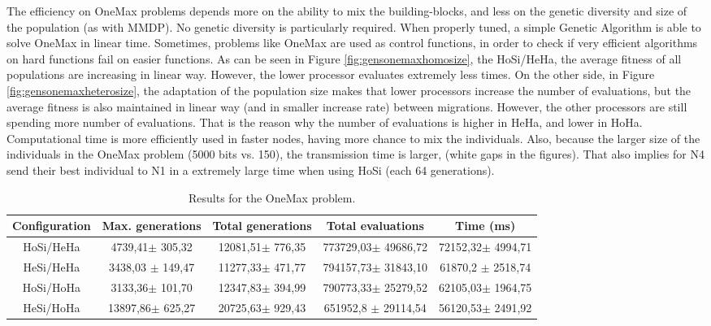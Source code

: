 \documentclass{sig-alternate}
\begin{document}
The efficiency on OneMax problems depends more on the ability to mix the building-blocks, and less on the genetic diversity and size of the population (as with MMDP). No genetic diversity is particularly required. When properly tuned, a simple Genetic Algorithm is able to solve OneMax in linear time. Sometimes, problems like OneMax are used as control functions, in order to check if very efficient algorithms on hard functions fail on easier functions. As can be seen in Figure \ref{fig:gensonemaxhomosize}, the HoSi/HeHa, the average fitness of all populations are increasing in linear way. However, the lower processor evaluates extremely less times.  On the other side, in Figure \ref{fig:gensonemaxheterosize}, the adaptation of the population size makes that lower processors increase the number of evaluations, but the average fitness is also maintained in linear way (and in smaller increase rate) between migrations. However, the other processors are still spending more number of evaluations. That is the reason why the number of evaluations is higher in HeHa, and lower in HoHa. Computational time is more efficiently used in faster nodes, having more chance to mix the individuals. Also, because the larger size of the individuals in the OneMax problem (5000 bits vs. 150), the transmission time is larger, (white gaps in the figures). That also implies for N4 send their best individual to N1 in a extremely large time when using HoSi (each 64 generations).

\begin{table*}
\centering
\caption{Results for the OneMax problem.}
\begin{tabular}{|c|c|c|c|c|} \hline
Configuration	& Max. generations			& Total generations			& 	Total evaluations			& Time (ms) \\ \hline
HoSi/HeHa		& 4739,41$\pm$	305,32 		&	12081,51$\pm$	776,35 	&	773729,03$\pm$	49686,72 	&	72152,32$\pm$	4994,71 \\ \hline
HeSi/HeHa		&	3438,03 $\pm$	149,47 &	11277,33$\pm$	471,77 &	794157,73$\pm$	31843,10 	&	61870,2	$\pm$ 2518,74 \\ \hline \hline
HoSi/HoHa		&	3133,36$\pm$	101,70 	&	12347,83$\pm$	394,99 	&	790773,33$\pm$	25279,52 	&	62105,03$\pm$	1964,75 \\ \hline
HeSi/HoHa		& 13897,86$\pm$	625,27 		&	20725,63$\pm$	929,43 	&	651952,8 $\pm$	29114,54	&	56120,53$\pm$	2491,92 \\ \hline
\end{tabular}
\label{tab:onemaxresults}
\end{table*}
\end{document}
